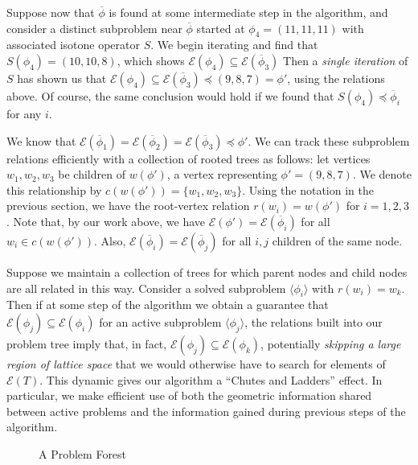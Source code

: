 \documentclass[11pt,reqno]{amsart}
\theoremstyle{definition}
\numberwithin{equation}{section}
\newcommand{\ol}{\overline}
\newcommand{\lag}{\langle}
\newcommand{\rag}{\rangle}
\newcommand{\pre}{\phi}
\newcommand{\sub}{\subseteq}
\newcommand{\fix}{\mathcal{E}}
\newcommand{\peq}{\preceq}
\newcommand{\toppre}{\ol{\pre}}
\begin{document}
Suppose now that $\toppre$ is found at some intermediate step in the algorithm, and consider a distinct subproblem near $\toppre$ started at $\pre_4 = (11,11,11)$ with associated isotone operator $S$.
We begin iterating and find that $S(\pre_4) = (10,10,8)$, which shows $\fix(\pre_4) \sub \fix(\toppre_3)$ 
Then a \emph{single iteration} of $S$ has shown us that $\fix(\pre_4) \sub \fix(\toppre_3) \peq (9,8,7) = \pre'$, using the relations above. 
Of course, the same conclusion would hold if we found that  $S(\pre_4) \peq \toppre_i$ for any $i$. 

We know that $\fix(\toppre_1) = \fix(\toppre_2) = \fix(\toppre_3) \peq \pre'$. 
We can track these subproblem relations efficiently with a collection of rooted trees as follows: let vertices $w_1,w_2,w_3$ be children of $w(\pre')$, a vertex representing $\pre' = (9,8,7)$. 
We denote this relationship by $c(w(\pre')) = \{w_1,w_2,w_3\}$.
Using the notation in the previous section, we have the root-vertex relation $r(w_i) = w(\pre')$ for $i = 1,2,3$. 
Note that, by our work above, we have $\fix(\pre') = \fix(\toppre_i)$ for all $w_i \in c(w(\pre'))$. 
Also, $\fix(\toppre_i) = \fix(\toppre_j)$ for all $i,j$ children of the same node. 

Suppose we maintain a collection of trees for which parent nodes and child nodes are all related in this way. 
Consider a solved subproblem $\lag \pre_i \rag$ with $r(w_i) = w_k$.
Then if at some step of the algorithm we obtain a guarantee that $\fix(\pre_j) \sub \fix(\pre_i)$ for an active subproblem $\lag \pre_j \rag$, the relations built into our problem tree imply that, in fact, $\fix(\pre_j) \sub \fix(\pre_k)$, potentially \emph{skipping a large region of lattice space} that we would otherwise have to search for elements of $\fix(T)$. 
This dynamic gives our algorithm a ``Chutes and Ladders'' effect. 
In particular, we make efficient use of both the geometric information shared between active problems and the information gained during previous steps of the algorithm. 

\begin{figure} \label{fig:forest} 
\caption{A Problem Forest}
\end{figure}
\end{document}
